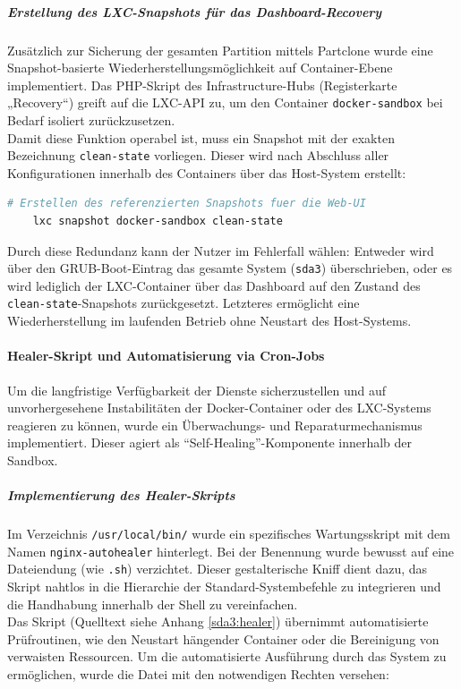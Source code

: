 \documentclass[11pt,
a4paper,
numbers=nonperiod,
footsepline,
oneside,
numbers=noenddot,
bibliography=totoc
]{scrartcl}
\begin{document}
\subparagraph{Erstellung des LXC-Snapshots für das Dashboard-Recovery}
Zusätzlich zur Sicherung der gesamten Partition mittels Partclone wurde eine Snapshot-basierte Wiederherstellungsmöglichkeit auf Container-Ebene implementiert. Das PHP-Skript des Infrastructure-Hubs (Registerkarte „Recovery“) greift auf die LXC-API zu, um den Container \texttt{docker-sandbox} bei Bedarf isoliert zurückzusetzen.\\

Damit diese Funktion operabel ist, muss ein Snapshot mit der exakten Bezeichnung \texttt{clean-state} vorliegen. Dieser wird nach Abschluss aller Konfigurationen innerhalb des Containers über das Host-System erstellt:

\begin{lstlisting}[language=bash]
	# Erstellen des referenzierten Snapshots fuer die Web-UI
	lxc snapshot docker-sandbox clean-state
\end{lstlisting}
\bigskip
Durch diese Redundanz kann der Nutzer im Fehlerfall wählen: Entweder wird über den GRUB-Boot-Eintrag das gesamte System (\texttt{sda3}) überschrieben, oder es wird lediglich der LXC-Container über das Dashboard auf den Zustand des \texttt{clean-state}-Snapshots zurückgesetzt. Letzteres ermöglicht eine Wiederherstellung im laufenden Betrieb ohne Neustart des Host-Systems.

\paragraph{Healer-Skript und Automatisierung via Cron-Jobs}

Um die langfristige Verfügbarkeit der Dienste sicherzustellen und auf unvorhergesehene Instabilitäten der Docker-Container oder des LXC-Systems reagieren zu können, wurde ein Überwachungs- und Reparaturmechanismus implementiert. Dieser agiert als "`Self-Healing"'-Komponente innerhalb der Sandbox.

\subparagraph{Implementierung des Healer-Skripts}
Im Verzeichnis \texttt{/usr/local/bin/} wurde ein spezifisches Wartungsskript mit dem Namen \texttt{nginx-autohealer} hinterlegt. Bei der Benennung wurde bewusst auf eine Dateiendung (wie \texttt{.sh}) verzichtet. Dieser gestalterische Kniff dient dazu, das Skript nahtlos in die Hierarchie der Standard-Systembefehle zu integrieren und die Handhabung innerhalb der Shell zu vereinfachen.\\

Das Skript (Quelltext siehe Anhang \ref{sda3:healer}) übernimmt automatisierte Prüfroutinen, wie den Neustart hängender Container oder die Bereinigung von verwaisten Ressourcen. Um die automatisierte Ausführung durch das System zu ermöglichen, wurde die Datei mit den notwendigen Rechten versehen:
\end{document}
